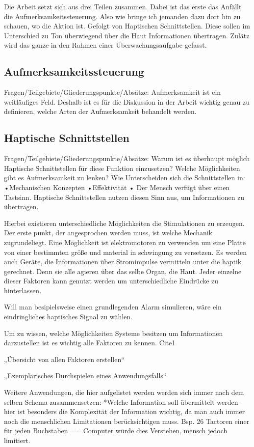 \documentclass{llncs}					%
\begin{document}
Die Arbeit setzt sich aus drei Teilen zusammen. Dabei ist das erste das Anfällt die Aufmerksamkeitssteuerung. Also wie bringe ich jemanden dazu dort hin zu schauen, wo die Aktion ist. Gefolgt von Haptischen Schnittstellen. Diese sollen im Unterschied zu Ton überwiegend über die Haut Informationen übertragen. Zulätz wird das ganze in den Rahmen einer Überwachungsaufgabe gefasst.

\subsection{Aufmerksamkeitssteuerung}
Fragen/Teilgebiete/Gliederungspunkte/Absätze:
Aufmerksamkeit ist ein weitläufiges Feld. Deshalb ist es für die Diskussion in der Arbeit wichtig genau zu definieren, welche Arten der Aufmerksamkeit behandelt werden.

\subsection{Haptische Schnittstellen}
Fragen/Teilgebiete/Gliederungspunkte/Absätze:
Warum ist es überhaupt möglich Haptische Schnittstellen für diese Funktion einzusetzen?
Welche Möglichkeiten gibt es Aufmerksamkeit zu lenken?
Wie Unterscheiden sich die Schnittstellen in:
•Mechanischen Konzepten
•Effektivität
•
Der Mensch verfügt über einen Tastsinn. Haptische Schnittstellen nutzen diesen Sinn aus, um Informationen zu übertragen.

Hierbei existieren unterschiedliche Möglichkeiten die Stimulationen zu erzeugen.
Der erste punkt, der angesprochen werden muss, ist welche Mechanik zugrundeliegt. Eine Möglichkeit ist elektromotoren zu verwenden um eine Platte von einer bestimmten größe und material in schwingung zu versetzen. Es werden auch Geräte, die Informationen über Stromimpulse vermitteln unter die haptik gerechnet. Denn sie alle agieren über das selbe Organ, die Haut. Jeder einzelne dieser Faktoren kann genutzt werden um unterschiedliche Eindrücke zu hinterlassen.

Will man besipielsweise einen grundlegenden Alarm simulieren, wäre ein eindringliches haptisches Signal zu wählen.

Um zu wissen, welche Möglichkeiten Systeme besitzen um Informationen darzustellen ist es wichtig alle Faktoren zu kennen. Cite1

„Übersicht von allen Faktoren erstellen“

„Exemplarisches Durchspielen eines Anwendungsfalls“

Weitere Anwendungen, die hier aufgelistet werden werden sich immer nach dem selben Schema zusammensetzen:
*Welche Information soll übermittelt werden
-hier ist besonders die Komplexität der Information wichtig, da man auch immer noch die menschlichen Limitationen berücksichtigen muss.
Bsp. 26 Tactoren einer für jeden Buchstaben == Computer würde dies Verstehen, mensch jedoch limitiert.
\end{document}
